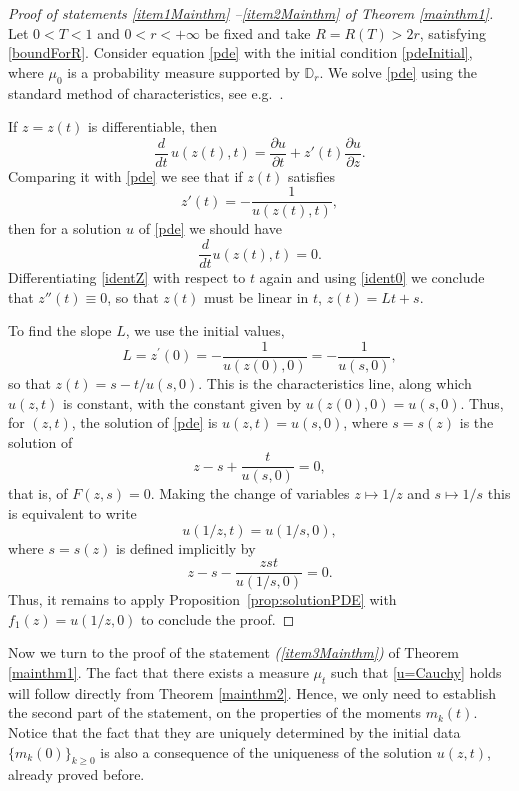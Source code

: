 \documentclass[reqno,11pt]{amsart}
\theoremstyle{plain}
\theoremstyle{definition}
\theoremstyle{remark}
\numberwithin{equation}{section}
\numberwithin{equation}{section}
\newcommand{\D}{\mathbb{D}}
\begin{document}
\begin{proof}[Proof of statements \textit{\eqref{item1Mainthm}} --\textit{\eqref{item2Mainthm}} of Theorem \ref{mainthm1}]

Let $0<T<1$ and $0<r<+\infty$ be fixed and take $R=R(T)>2r$, satisfying \eqref{boundForR}. Consider equation \eqref{pde} with the initial condition \eqref{pdeInitial}, where $\mu_0$ is a  probability measure supported by $\D_r$. We solve \eqref{pde} using the standard method of characteristics, see e.g.~\cite{salih2015inviscid, MR1699025}.
	
	If $z=z(t)$ is differentiable, then
	$$
	\frac{d}{dt}\,   u(z(t),t) =\frac{\partial u}{\partial t} + z'(t)  \frac{\partial u}{\partial z}.
	$$
	Comparing it with \eqref{pde} we see that if $z(t)$ satisfies
	\begin{equation} \label{identZ}
		z'(t)=-\frac{1}{u(z(t),t)},
	\end{equation}
	then for a solution $u$ of \eqref{pde}  we should have
	\begin{equation} \label{ident0}
		\frac{d}{dt} u\left( z(t), t\right)=0.
	\end{equation}
	Differentiating \eqref{identZ} with respect to $t$ again and using \eqref{ident0} we conclude that $z''(t)\equiv 0$, so that $z(t)$ must be linear in $t$, $z(t)=Lt+s$. 
	
	To find the slope $L$, we use the initial values,
	$$
	L=z^{\prime}(0)=-\frac{1}{u(z(0), 0)}=-\frac{1}{u(s,0)},
	$$
	so that $z(t)=s-t/u(s, 0)$. This is the characteristics line, along which $u(z, t)$ is constant, with the constant given by
	$u(z(0), 0)=u(s, 0)$. Thus, for $(z, t)$, the solution of \eqref{pde} is $	u(z,t) = u (s, 0)$, where $s=s(z)$ is  the solution of  
	$$ 
	z  -s+\frac{t}{u(s, 0)}=0,
	$$
	that is, of $F(z,s)=0$. Making the change of variables $z \mapsto 1/z$ and $s \mapsto 1/s$ this is equivalent to write 
	\begin{equation} \label{charact1a}
		u(1/z,t) = u (1/s, 0), 
	\end{equation}
	where $s=s(z)$ is defined implicitly by 
	\begin{equation} \label{charact1b}
		z  -s-\frac{zs t}{u(1/s, 0)}=0.
	\end{equation}
	Thus, it remains to apply Proposition~\ref{prop:solutionPDE} with 
	$	f_1(z)=u(1/z,0) $ to conclude the proof.
\end{proof}

Now we turn to the proof of the statement \textit{(\ref{item3Mainthm})} of Theorem \ref{mainthm1}. The fact that there exists a measure $\mu_t$ such that \eqref{u=Cauchy} holds will follow directly from Theorem \ref{mainthm2}.
Hence, we only need to establish the second part of the statement, on the properties of the moments $m_k(t)$. Notice that the fact that they are uniquely determined by the initial data $\{m_k(0)\}_{k\ge 0}$ is also a consequence of the uniqueness of the solution $u(z,t)$, already proved before.
\end{document}
